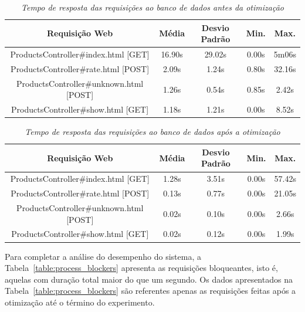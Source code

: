 \begin{table}\centering
\begin{tabular}{c c c c c}
\hline \hline
\textbf{Requisição Web}
& \textbf{Média}
& \textbf{Desvio Padrão}
& \textbf{Min.} 
& \textbf{Max.} \\ \hline
ProductsController\#index.html [GET]    & 16.90s & 29.02s &  0.00s &  5m06s \\
\hline
ProductsController\#rate.html [POST]    &  2.09s &  1.24s &  0.80s & 32.16s \\
\hline
ProductsController\#unknown.html [POST] &  1.26s &  0.54s &  0.85s &  2.42s \\
\hline
ProductsController\#show.html [GET]     &  1.18s &  1.21s &  0.00s &  8.52s \\
\hline
\end{tabular}
\caption{\it Tempo de resposta das requisições ao banco de dados antes da otimização \label{table:before_stats}}
\end{table}

\begin{table}\centering
\begin{tabular}{c c c c c}
\hline \hline
\textbf{Requisição Web}
& \textbf{Média}
& \textbf{Desvio Padrão}
& \textbf{Min.} 
& \textbf{Max.} \\ \hline
ProductsController\#index.html [GET]    & 1.28s &  3.51s &  0.00s & 57.42s \\
\hline
ProductsController\#rate.html [POST]    & 0.13s &  0.77s &  0.00s & 21.05s \\
\hline
ProductsController\#unknown.html [POST] & 0.02s &  0.10s &  0.00s &  2.66s \\
\hline
ProductsController\#show.html [GET]     & 0.02s &  0.12s &  0.00s &  1.99s \\
\hline
\end{tabular}
\caption{\it Tempo de resposta das requisições ao banco de dados após a otimização \label{table:after_stats}}
\end{table}

Para completar a análise do desempenho do sistema, a Tabela~\ref{table:process_blockers} apresenta as requisições bloqueantes, isto é, aquelas com duração total maior do que um segundo. Os dados apresentados na Tabela~\ref{table:process_blockers} são referentes apenas as requisições feitas após a otimização até o término do experimento.

